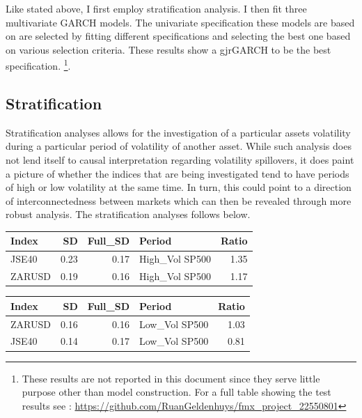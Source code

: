 \documentclass[11pt,preprint, authoryear]{elsarticle}
\let\origtable\table
\let\endorigtable\endtable
\renewenvironment{table}[1][2] {
    \expandafter\origtable\expandafter[H]
} {
    \endorigtable
}
\numberwithin{equation}{section}
\numberwithin{figure}{section}
\numberwithin{table}{section}
\let\rmarkdownfootnote\footnote%
\def\footnote{\protect\rmarkdownfootnote}
\begin{document}
Like stated above, I first employ stratification analysis. I then fit
three multivariate GARCH models. The univariate specification these
models are based on are selected by fitting different specifications and
selecting the best one based on various selection criteria. These
results show a gjrGARCH to be the best specification.
\footnote{These results are not reported in this document since they serve little purpose other than model construction. For a full table showing the test results see : \url{https://github.com/RuanGeldenhuys/fmx_project_22550801}}.

\hypertarget{stratification}{%
\subsection{Stratification}\label{stratification}}

Stratification analyses allows for the investigation of a particular
assets volatility during a particular period of volatility of another
asset. While such analysis does not lend itself to causal interpretation
regarding volatility spillovers, it does paint a picture of whether the
indices that are being investigated tend to have periods of high or low
volatility at the same time. In turn, this could point to a direction of
interconnectedness between markets which can then be revealed through
more robust analysis. The stratification analyses follows below.

\begin{table}[H]
\centering
\caption{S\&P 500 High Volatility \label{tab4}} 
\begin{tabular}{lrrlr}
  \hline
Index & SD & Full\_SD & Period & Ratio \\ 
  \hline
JSE40 & 0.23 & 0.17 & High\_Vol SP500 & 1.35 \\ 
  ZARUSD & 0.19 & 0.16 & High\_Vol SP500 & 1.17 \\ 
   \hline
\end{tabular}
\end{table}
\begin{table}[H]
\centering
\caption{S\&P 500 Low Volatility \label{tab5}} 
\begin{tabular}{lrrlr}
  \hline
Index & SD & Full\_SD & Period & Ratio \\ 
  \hline
ZARUSD & 0.16 & 0.16 & Low\_Vol SP500 & 1.03 \\ 
  JSE40 & 0.14 & 0.17 & Low\_Vol SP500 & 0.81 \\ 
   \hline
\end{tabular}
\end{table}
\end{document}
